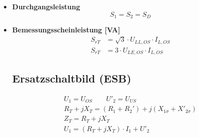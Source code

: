 \begin{itemize}


    \item[]{\textbf{Durchgangsleistung}}
    \begin{equation*}
        S_{1} = S_{2} = S_{D}
    \end{equation*}

\item[] {\textbf{Bemessungsscheinleistung [VA]}}
    \begin{align*}
        S_{rT} &= \sqrt{3} \cdot U_{LL,OS} \cdot I_{L,OS}\\
        S_{rT} &= 3 \cdot U_{LE,OS} \cdot I_{L,OS}
        \end{align*}

\subsection{Ersatzschaltbild (ESB)}

\begin{gather*}
    U_1 = U_{OS} \qquad U'_2 = U_{US}\\
    R_{T} + jX_{T} = (R_1+R_2')+j(X_{1\sigma}+X'_{2\sigma})\\
    Z_{T} = R_{T} + jX_{T}\\
    U_1 = (R_T + jX_T) \cdot I_1 + U'_2
\end{gather*}


\end{itemize}
